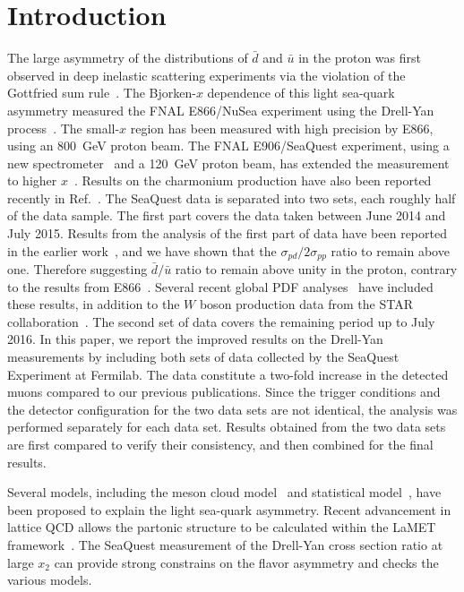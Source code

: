 \documentclass[reprint,aps,unsortedaddress,superscriptaddress,prc,floatfix,showpacs,linenumbers,final]{revtex4-2}
\begin{document}
\section{Introduction}
The large asymmetry of the distributions of $\bar{d}$ and $\bar{u}$ in the proton was first observed in deep inelastic
scattering experiments via the violation of the Gottfried sum rule~\cite{amaudruz1991}. 
The Bjorken-$x$ dependence of this light sea-quark asymmetry measured the FNAL E866/NuSea
experiment using the Drell-Yan process~\cite{towell2001}.
The small-$x$ region has been measured with high precision by E866,
using an \SI{800}{\GeV} proton beam. 
The FNAL E906/SeaQuest experiment, using a new spectrometer~\cite{aidala2019} and a \SI{120}{\GeV}
proton beam, has extended the measurement to higher $x$~\cite{dove2021,dove2023}. 
Results on the charmonium production have also been reported recently in Ref.~\cite{leung2024a}.
The SeaQuest data is separated into two sets, each roughly half of the data sample.
The first part covers the data taken between June 2014 and July 2015.
Results from the analysis of the first part of data have been reported in the earlier work~\cite{dove2021,dove2023}, 
and we have shown that the $\sigma_{pd}/2\sigma_{pp}$ ratio to remain above one.
Therefore suggesting $\bar{d}/\bar{u}$ ratio to remain above unity in the proton,
contrary to the results from E866~\cite{towell2001}.
Several recent global PDF analyses~\cite{cocuzza2021,ball2022a,accardi2023,alekhin2023}
have included these results, in addition to the $W$ boson production data from the STAR collaboration~\cite{adam2021}.
The second set of data covers the remaining period up to July 2016.
In this paper, we report the improved results on the Drell-Yan measurements
by including both sets of data collected by the SeaQuest Experiment at Fermilab.
The data constitute a two-fold increase in the detected muons compared to our previous publications.
Since the trigger
conditions and the detector configuration for the two data sets are not
identical, the analysis was performed separately for each data set. 
Results obtained from the two data sets are first compared to verify their
consistency, and then combined for the final results.


Several models, including the meson cloud model~\cite{alberg2022} and statistical model~\cite{soffer2019},
have been proposed to explain the light sea-quark asymmetry.
Recent advancement in lattice QCD allows the partonic structure to be calculated within the LaMET framework~\cite{constantinou2021}.
The SeaQuest measurement of the Drell-Yan cross section ratio at large $x_2$ can provide strong
constrains on the flavor asymmetry and checks the various models.
\end{document}
